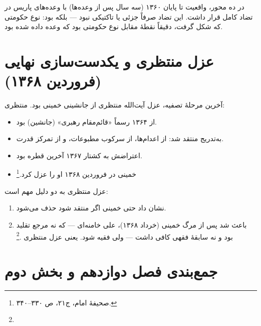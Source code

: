 \begin{warningBox}
در  ده محور، واقعیت تا پایان ۱۳۶۰ (سه سال پس از وعده‌ها) با وعده‌های پاریس در تضاد کامل قرار داشت. این تضاد صرفاً جزئی یا تاکتیکی نبود — بلکه  بود: نوع حکومتی که شکل گرفت، دقیقاً نقطهٔ مقابل نوع حکومتی بود که وعده داده شده بود.
\end{warningBox}

\section{عزل منتظری و یکدست‌سازی نهایی (فروردین ۱۳۶۸)}

آخرین مرحلهٔ تصفیه، عزل آیت‌الله منتظری از جانشینی خمینی بود. منتظری:

\begin{itemize}[label=\textcolor{cPrimary}{$\blacktriangleright$}, rightmargin=2em]
    \item از ۱۳۶۴ رسماً «قائم‌مقام رهبری» (جانشین) بود.
    \item به‌تدریج منتقد شد: از اعدام‌ها، از سرکوب مطبوعات، و از تمرکز قدرت.
    \item اعتراضش به کشتار ۱۳۶۷ آخرین قطره بود.
    \item خمینی در فروردین ۱۳۶۸ او را عزل کرد.\footnote{صحیفهٔ امام، ج۲۱، ص ۳۳۰–۳۴۰.}
\end{itemize}

\begin{noteBox}
عزل منتظری به دو دلیل مهم است:
\begin{enumerate}[label=\textcolor{cGold}{\bfseries\arabic*.}, rightmargin=2em]
    \item نشان داد حتی  خمینی اگر منتقد شود حذف می‌شود.
    \item باعث شد پس از مرگ خمینی (خرداد ۱۳۶۸)، علی خامنه‌ای — که نه مرجع تقلید بود و نه سابقهٔ فقهی کافی داشت — ولی فقیه شود. یعنی عزل منتظری .\footnote{}
\end{enumerate}
\end{noteBox}

\section{جمع‌بندی فصل دوازدهم و بخش دوم}

